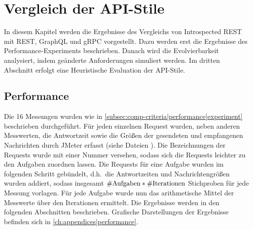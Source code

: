 \chapter{Vergleich der API-Stile}\label{ch:comparison}
In diesem Kapitel werden die Ergebnisse des Vergleichs von Introspected REST mit REST, GraphQL und gRPC vorgestellt. Dazu werden erst die Ergebnisse des Performance-Experiments beschrieben. Danach wird die Evolvierbarkeit analysiert, indem geänderte Anforderungen simuliert werden. Im dritten Abschnitt erfolgt eine Heuristische Evaluation der API-Stile.

\section{Performance}\label{sec:comparison|performance}

Die 16 Messungen wurden wie in \cref{subsec:comp-criteria|performance|experiment} beschrieben durchgeführt. Für jeden einzelnen Request wurden, neben anderen Messwerten, die Antwortzeit sowie die Größen der gesendeten und empfangenen Nachrichten durch JMeter erfasst (siehe Dateien ). Die Bezeichnungen der Requests wurde mit einer Nummer versehen, sodass sich die Requests leichter zu den Aufgaben zuordnen lassen. Die Requests für eine Aufgabe wurden im folgenden Schritt gebündelt, d.h.\ die Antwortzeiten und Nachrichtengrößen wurden addiert, sodass insgesamt \(\#\text{Aufgaben} * \#\text{Iterationen}\) Stichproben für jede Messung vorlagen. Für jede Aufgabe wurde nun das arithmetische Mittel der Messwerte über den Iterationen ermittelt. Die Ergebnisse werden in den folgenden Abschnitten beschrieben. Grafische Darstellungen der Ergebnisse befinden sich in \cref{ch:appendices|performance}.


